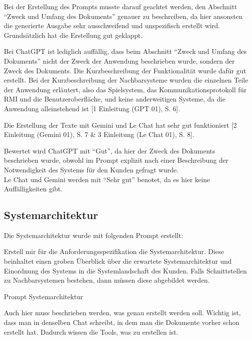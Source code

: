 Bei der Erstellung des Prompts musste darauf geachtet werden, den Abschnitt ``Zweck und Umfang des Dokuments'' genauer zu beschreiben, da hier 
ansonsten die generierte Ausgabe sehr ausschweifend und unspezifisch erstellt wird. Grundsätzlich hat die Erstellung gut geklappt.

Bei ChatGPT ist lediglich auffällig, dass beim Abschnitt ``Zweck und Umfang des Dokuments'' nicht der Zweck der Anwendung beschrieben wurde, 
sondern der Zweck des Dokuments. Die Kurzbeschreibung der Funktionalität wurde dafür gut erstellt. Bei der Kurzbeschreibung der 
Nachbarsysteme wurden die einzelnen Teile der Anwendung erläutert, also das Spielsystem, das Kommunikationsprotokoll für RMI und die 
Benutzeroberfläche, und keine anderweitigen Systeme, da die Anwendung alleinstehend ist [1 Einleitung (GPT 01), S. 6].

Die Erstellung der Texte mit Gemini und Le Chat hat sehr gut funktioniert [2 Einleitung (Gemini 01), S. 7 \& 3 Einleitung (Le Chat 01), S. 8].

Bewertet wird ChatGPT mit ``Gut'', da hier der Zweck des Dokuments beschrieben wurde, obwohl im Prompt explizit nach einer Beschreibung der 
Notwendigkeit des Systems für den Kunden gefragt wurde.\\
Le Chat und Gemini werden mit ``Sehr gut'' benotet, da es hier keine Auffälligkeiten gibt.

\subsection*{Systemarchitektur}

Die Systemarchitektur wurde mit folgenden Prompt erstellt:

\begin{prompt}[H]
    \begin{tcolorbox}[colback=gray!20, colframe=gray!20, boxrule=0pt, sharp corners] 
        Erstell mir für die Anforderungsspezifikation die Systemarchitektur. Diese beinhaltet einen groben Überblick über die erwartete Systemarchitektur 
        und Einordnung des Systems in die Systemlandschaft des Kunden. Falls Schnittstellen zu Nachbarsystemen bestehen, dann müssen diese abgebildet werden.
        \vfill
    \end{tcolorbox}
    \caption{Prompt Systemarchitektur}
    \label{Prompt Systemarchitektur}
\end{prompt}

Auch hier muss beschrieben werden, was genau erstellt werden soll. Wichtig ist, dass man in denselben Chat schreibt, in dem man die 
Dokumente vorher schon erstellt hat. Dadurch wissen die Tools, was zu erstellen ist.

